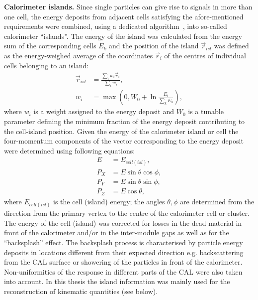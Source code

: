 \textbf{Calorimeter islands.}
Since single particles can give rise to signals in more than one cell, the energy deposits from adjacent cells satisfying the afore-mentioned requirements were combined, using a dedicated algorithm~\cite{upub:grosse-knetter:zn9739}, into so-called calorimeter ``islands''. The energy of the island was calculated from the energy sum of the corresponding cells $E_k$ and the position of the island $\vec{r}_{isl}$ was defined as the energy-weighed average of the coordinates $\vec{r}_i$ of the centres of individual cells belonging to an island:
\begin{align}
\vec{r}_{isl} &= \frac{\sum_i{w_i \vec{r}_i}}{\sum_i{w_i}}, \\
w_i &= \max\left(0,W_0+\ln{\frac{E_i}{\sum_k{E_k}}}\right),
\end{align}
where $w_i$ is a weight assigned to the energy deposit and $W_0$ is a tunable parameter defining the minimum fraction of the energy deposit contributing to the cell-island position. Given the energy of the calorimeter island or cell the four-momentum components of the vector corresponding to the energy deposit were determined using following equations:
\begin{align}
	E    &= E_{cell (isl)}, \\
	P_X &= E \sin{\theta}\cos{\phi}, \\
	P_Y &= E \sin{\theta}\sin{\phi}, \\
	P_Z &= E \cos{\theta},
\end{align}
where $E_{cell \left( isl \right)}$ is the cell (island) energy; the angles $\theta, \phi$ are determined from the direction from the primary vertex to the centre of the calorimeter cell or cluster. The energy of the cell (island) was corrected for losses in the dead material in front of the calorimeter and/or in the inter-module gaps as well as for the ``backsplash'' effect. The backsplash process is characterised by particle energy deposits in locations different from their expected direction e.g. backscattering from the CAL surface or showering of the particles in front of the calorimeter. Non-uniformities of the response in different parts of the CAL were also taken into account. In this thesis the island information was mainly used for the reconstruction of kinematic quantities (see below).